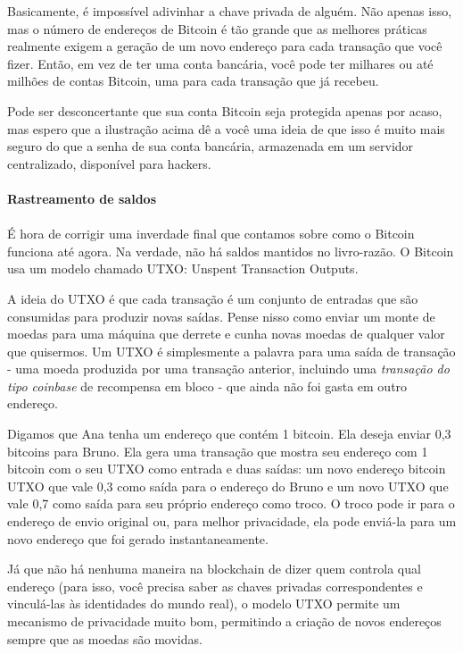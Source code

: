 Basicamente, é impossível adivinhar a chave privada de alguém. Não apenas isso, mas o número de endereços de Bitcoin é tão grande que as melhores práticas realmente exigem a geração de um novo endereço para cada transação que você fizer. Então, em vez de ter uma conta bancária, você pode ter milhares ou até milhões de contas Bitcoin, uma para cada transação que já recebeu.

Pode ser desconcertante que sua conta Bitcoin seja protegida apenas por acaso, mas espero que a ilustração acima dê a você uma ideia de que isso é muito mais seguro do que a senha de sua conta bancária, armazenada em um servidor centralizado, disponível para hackers.

\paragraph{Rastreamento de saldos}
\paragraph{}

É hora de corrigir uma inverdade final que contamos sobre como o Bitcoin funciona até agora. Na verdade, não há saldos mantidos no livro-razão. O Bitcoin usa um modelo chamado UTXO: Unspent Transaction Outputs.

A ideia do UTXO é que cada transação é um conjunto de entradas que são consumidas para produzir novas saídas. Pense nisso como enviar um monte de moedas para uma máquina que derrete e cunha novas moedas de qualquer valor que quisermos. Um UTXO é simplesmente a palavra para uma saída de transação - uma moeda produzida por uma transação anterior, incluindo uma \textit{transação do tipo coinbase} de recompensa em bloco - que ainda não foi gasta em outro endereço.

Digamos que Ana tenha um endereço que contém 1 bitcoin. Ela deseja enviar 0,3 bitcoins para Bruno. Ela gera uma transação que mostra seu endereço com 1 bitcoin com o seu UTXO como entrada e duas saídas: um novo endereço bitcoin UTXO que vale 0,3 como saída para o endereço do Bruno e um novo UTXO que vale 0,7 como saída para seu próprio endereço como troco. O troco pode ir para o endereço de envio original ou, para melhor privacidade, ela pode enviá-la para um novo endereço que foi gerado instantaneamente.

Já que não há nenhuma maneira na blockchain de dizer quem controla qual endereço (para isso, você precisa saber as chaves privadas correspondentes e vinculá-las às identidades do mundo real), o modelo UTXO permite um mecanismo de privacidade muito bom, permitindo a criação de novos endereços sempre que as moedas são movidas.

